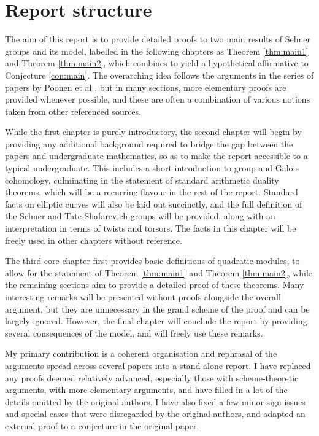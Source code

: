 \section{Report structure}

The aim of this report is to provide detailed proofs to two main results of Selmer groups and its model, labelled in the following chapters as Theorem \ref{thm:main1} and Theorem \ref{thm:main2}, which combines to yield a hypothetical affirmative to Conjecture \ref{con:main}. The overarching idea follows the arguments in the series of papers by Poonen et al \cite{Poo17, PPVW19, BKLPR15, PR12}, but in many sections, more elementary proofs are provided whenever possible, and these are often a combination of various notions taken from other referenced sources.

While the first chapter is purely introductory, the second chapter will begin by providing any additional background required to bridge the gap between the papers and undergraduate mathematics, so as to make the report accessible to a typical undergraduate. This includes a short introduction to group and Galois cohomology, culminating in the statement of standard arithmetic duality theorems, which will be a recurring flavour in the rest of the report. Standard facts on elliptic curves will also be laid out succinctly, and the full definition of the Selmer and Tate-Shafarevich groups will be provided, along with an interpretation in terms of twists and torsors. The facts in this chapter will be freely used in other chapters without reference.

The third core chapter first provides basic definitions of quadratic modules, to allow for the statement of Theorem \ref{thm:main1} and Theorem \ref{thm:main2}, while the remaining sections aim to provide a detailed proof of these theorems. Many interesting remarks will be presented without proofs alongside the overall argument, but they are unnecessary in the grand scheme of the proof and can be largely ignored. However, the final chapter will conclude the report by providing several consequences of the model, and will freely use these remarks.

My primary contribution is a coherent organisation and rephrasal of the arguments spread across several papers into a stand-alone report. I have replaced any proofs deemed relatively advanced, especially those with scheme-theoretic arguments, with more elementary arguments, and have filled in a lot of the details omitted by the original authors. I have also fixed a few minor sign issues and special cases that were disregarded by the original authors, and adapted an external proof to a conjecture in the original paper.

